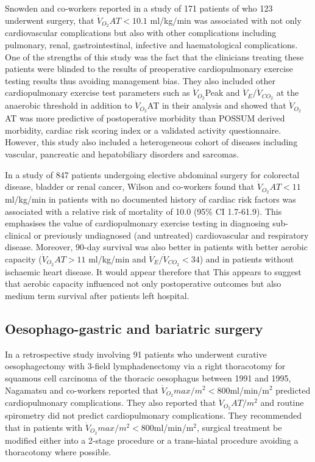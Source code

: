 Snowden and co-workers reported in a study of 171 patients of who 123 underwent surgery, that $\dot{V}_{O_2}AT<10.1$ ml/kg/min was associated with not only cardiovascular complications but also with other complications including pulmonary, renal, gastrointestinal, infective and haematological complications. One of the strengths of this study was the fact that the clinicians treating these patients were blinded to the results of preoperative cardiopulmonary exercise testing results thus avoiding management bias. They also included other cardiopulmonary exercise test parameters such as $\dot{V}_{O_2}$Peak and $\dot{V}_E/\dot{V}_{CO_2}$ at the anaerobic threshold in addition to $\dot{V}_{O_2}$AT in their analysis and showed that $\dot{V}_{O_2}$AT was more predictive of postoperative morbidity than POSSUM derived morbidity, cardiac risk scoring index or a validated activity questionnaire. However, this study also included a heterogeneous cohort of diseases including vascular, pancreatic and hepatobiliary disorders and sarcomas.\parencite{snowden_submaximal_2010}

In a study of 847 patients undergoing elective abdominal surgery for colorectal disease, bladder or renal cancer, Wilson and co-workers found that $\dot{V}_{O_2}AT<11$ ml/kg/min in patients with no documented history of cardiac risk factors was associated with a relative risk of mortality of 10.0 (95\% CI 1.7-61.9).\parencite{wilson_impaired_2010} This emphasises the value of cardiopulmonary exercise testing in diagnosing sub-clinical or previously undiagnosed (and untreated) cardiovascular and respiratory disease. Moreover, 90-day survival was also better in patients with better aerobic capacity ($\dot{V}_{O_2}AT>11$ ml/kg/min and $\dot{V}_E/\dot{V}_{CO_2}<34$) {a}nd in patients without ischaemic heart disease. It would appear therefore that This appears to suggest that aerobic capacity influenced not only postoperative outcomes but also medium term survival after patients left hospital.

\subsection{Oesophago-gastric and bariatric surgery}
In a retrospective study involving 91 patients who underwent curative oesophagectomy with 3-field lymphadenectomy via a
right thoracotomy for squamous cell carcinoma of the thoracic oesophagus between 1991 and 1995, Nagamatsu and co-workers reported that $\dot{V}_{O_2}max/m^2<800$ml/min/m$^2$ predicted cardiopulmonary complications.\parencite{nagamatsu_preoperative_2001} They also reported that $\dot{V}_{O_2}AT/m^2$ and routine spirometry did not predict cardiopulmonary complications. They recommended that in patients with $\dot{V}_{O_2}max/m^2<800$ml/min/m$^2$, surgical treatment be modified either into a 2-stage procedure or a trans-hiatal procedure avoiding a thoracotomy where possible.

